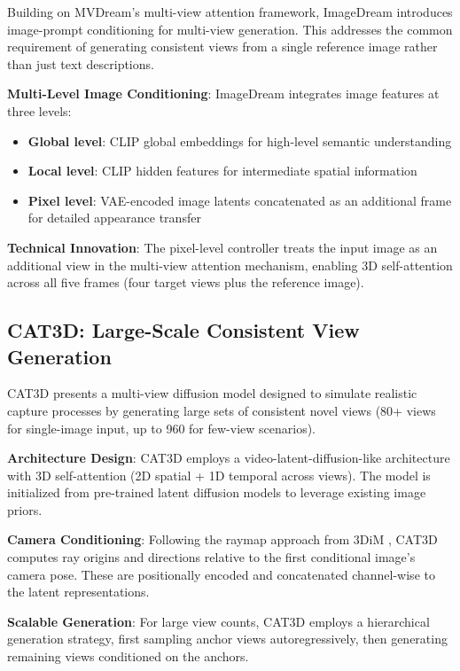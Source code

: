 Building on MVDream's multi-view attention framework, ImageDream \cite{imagedream} introduces image-prompt conditioning for multi-view generation. This addresses the common requirement of generating consistent views from a single reference image rather than just text descriptions.

\textbf{Multi-Level Image Conditioning}: ImageDream integrates image features at three levels:
\begin{itemize}
  \item \textbf{Global level}: CLIP global embeddings for high-level semantic understanding
  \item \textbf{Local level}: CLIP hidden features for intermediate spatial information
  \item \textbf{Pixel level}: VAE-encoded image latents concatenated as an additional frame for detailed appearance transfer
\end{itemize}

\textbf{Technical Innovation}: The pixel-level controller treats the input image as an additional view in the multi-view attention mechanism, enabling 3D self-attention across all five frames (four target views plus the reference image).

\subsection{CAT3D: Large-Scale Consistent View Generation}

CAT3D \cite{cat3d} presents a multi-view diffusion model designed to simulate realistic capture processes by generating large sets of consistent novel views (80+ views for single-image input, up to 960 for few-view scenarios).

\textbf{Architecture Design}: CAT3D employs a video-latent-diffusion-like architecture with 3D self-attention (2D spatial + 1D temporal across views). The model is initialized from pre-trained latent diffusion models to leverage existing image priors.

\textbf{Camera Conditioning}: Following the raymap approach from 3DiM \cite{novelviewsynthesisdiffusion}, CAT3D computes ray origins and directions relative to the first conditional image's camera pose. These are positionally encoded and concatenated channel-wise to the latent representations.

\textbf{Scalable Generation}: For large view counts, CAT3D employs a hierarchical generation strategy, first sampling anchor views autoregressively, then generating remaining views conditioned on the anchors.

